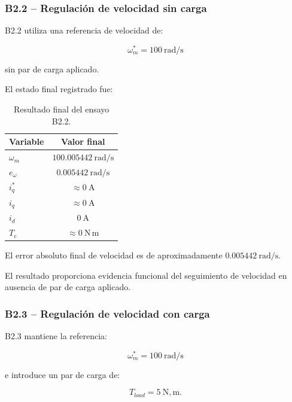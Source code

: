 \subsubsection{B2.2 -- Regulación de velocidad sin carga}

B2.2 utiliza una referencia de velocidad de:

\begin{equation}
\omega_m^*=100~\mathrm{rad/s}
\end{equation}

sin par de carga aplicado.

El estado final registrado fue:

\begin{table}[H]
\centering
\caption{Resultado final del ensayo B2.2.}
\label{tab:b2_2_resultado}
\begin{tabular}{lc}
\toprule
\textbf{Variable} & \textbf{Valor final} \\
\midrule
\(\omega_m\) & \(100.005442~\mathrm{rad/s}\) \\
\(e_{\omega}\) & \(0.005442~\mathrm{rad/s}\) \\
\(i_q^*\) & \(\approx0~\mathrm{A}\) \\
\(i_q\) & \(\approx0~\mathrm{A}\) \\
\(i_d\) & \(0~\mathrm{A}\) \\
\(T_e\) & \(\approx0~\mathrm{N\,m}\) \\
\bottomrule
\end{tabular}
\end{table}

El error absoluto final de velocidad es de aproximadamente \(0.005442~\mathrm{rad/s}\).

El resultado proporciona evidencia funcional del seguimiento de velocidad en ausencia de par de carga aplicado.

\subsubsection{B2.3 -- Regulación de velocidad con carga}

B2.3 mantiene la referencia:

\begin{equation}
\omega_m^*=100~\mathrm{rad/s}
\end{equation}

e introduce un par de carga de:

\begin{equation}
T_{load}=5~\mathrm{N,m}.
\end{equation}


